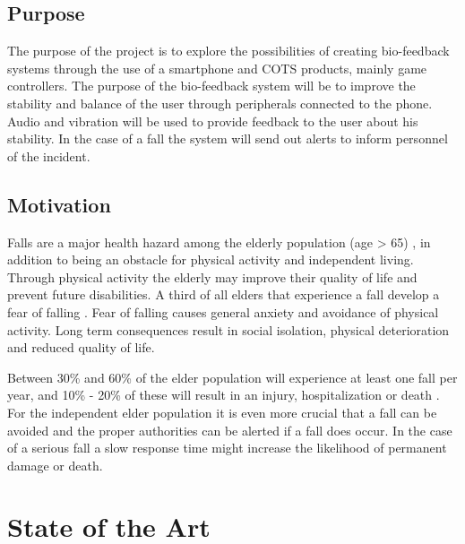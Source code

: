 \documentclass[11pt,twoside,a4paper]{report}
\begin{document}
\section{Purpose}
The purpose of the project is to explore the possibilities of creating bio-feedback systems through the use of a smartphone and COTS products, mainly game controllers. The purpose of the bio-feedback system will be to improve the stability and balance of the user through peripherals connected to the phone. Audio and vibration will be used to provide feedback to the user about his stability. In the case of a fall the system will send out alerts to inform personnel of the incident.

\section{Motivation}
Falls are a major health hazard among the elderly population (age > 65) \cite{fallsHealthHazard}, in addition to being an obstacle for physical activity and independent living. Through physical activity the elderly may improve their quality of life and prevent future disabilities\cite{physicalActivity}. A third of all elders that experience a fall develop a fear of falling \cite{fearOfFalling}. Fear of falling causes general anxiety and avoidance of physical activity. Long term consequences result in social isolation, physical deterioration and reduced quality of life.\cite{physicalAvoidance} %

Between 30\% and 60\% of the elder population will experience at least one fall per year, and 10\% - 20\% of these will result in an injury, hospitalization or death \cite{fallStatistics}. For the independent elder population it is even more crucial that a fall can be avoided and the proper authorities can be alerted if a fall does occur. In the case of a serious fall a slow response time might increase the likelihood of permanent damage or death\cite{personHomeDeath, dangerousFallHome}.


\chapter{State of the Art}
\end{document}
